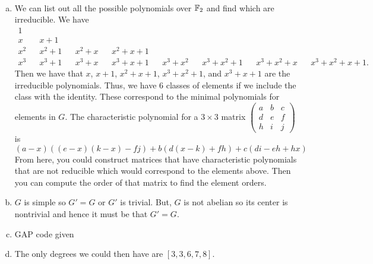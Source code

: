 \documentclass[leqno]{article}
\begin{document}
\begin{solution}~
\begin{enumerate}[(a)]
    \item We can list out all the possible polynomials over $\mathbb{F}_2$ and find which are irreducible.  We have
    \begin{align*}
        1\\
        x && x+1\\
        x^2 && x^2 + 1 && x^2+x && x^2+x+1\\
        x^3 && x^3 + 1 && x^3 + x && x^3 + x + 1 && x^3 + x^2 && x^3 + x^2 + 1 && x^3+x^2+x && x^3+x^2+x+1.
    \end{align*}
    Then we have that $x$, $x+1$, $x^2+x+1$, $x^3+x^2+1$, and $x^3+x+1$ are the irreducible polynomials.  Thus, we have 6 classes of elements if we include the class with the identity.  These correspond to the minimal polynomials for elements in $G$. The characteristic polynomial for a $3\times3$ matrix $\begin{pmatrix} a & b & c \\ d & e & f\\ h & i & j \end{pmatrix}$ is
    \[
    (a - x) ((e - x) (k - x) - f j) + b (d (x - k) + f h) + c (d i - e h + h x)
    \]
    From here, you could construct matrices that have characteristic polynomials that are not reducible which would correspond to the elements above. Then you can compute the order of that matrix to find the element orders.
    \item $G$ is simple so $G'=G$ or $G'$ is trivial. But, $G$ is not abelian so its center is nontrivial and hence it must be that $G'=G$.
    \item \textsf{GAP} code given
    \item The only degrees we could then have are $[3,3,6,7,8]$. 
\end{enumerate}
\end{solution}
\end{document}
